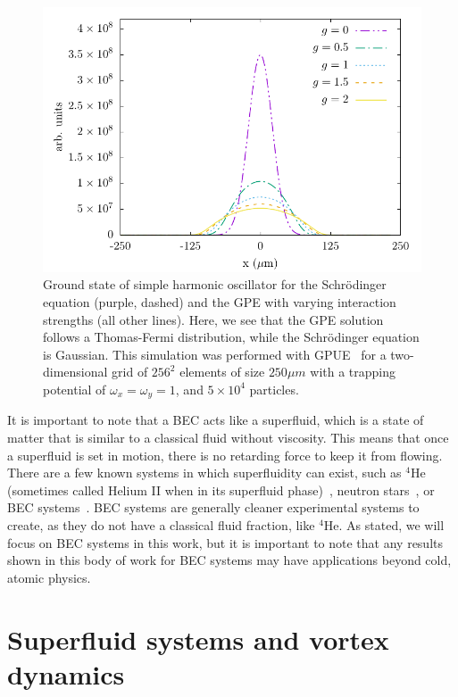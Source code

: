 \begin{figure}
\center \includegraphics[width = \textwidth]{data/qs/SHO/SHO.pdf}

\caption{Ground state of simple harmonic oscillator for the Schr\"odinger equation (purple, dashed) and the GPE with varying interaction strengths (all other lines).
Here, we see that the GPE solution follows a Thomas-Fermi distribution, while the Schr\"odinger equation is Gaussian.
This simulation was performed with GPUE~\cite{schloss2018} for a two-dimensional grid of $256^2$ elements of size $250 \mu m$ with a trapping potential of $\omega_x = \omega_y = 1$, and $5\times 10^4$ particles.}
\label{fig:TF}
\end{figure}

It is important to note that a BEC acts like a superfluid, which is a state of matter that is similar to a classical fluid without viscosity.
This means that once a superfluid is set in motion, there is no retarding force to keep it from flowing.
There are a few known systems in which superfluidity can exist, such as $^4$He (sometimes called Helium II when in its superfluid phase)~\cite{allen1938}, neutron stars~\cite{migdal1960}, or BEC systems~\cite{einstein1925, anderson1995}.
BEC systems are generally cleaner experimental systems to create, as they do not have a classical fluid fraction, like $^4$He.
As stated, we will focus on BEC systems in this work, but it is important to note that any results shown in this body of work for BEC systems may have applications beyond cold, atomic physics.

\section{Superfluid systems and vortex dynamics}

